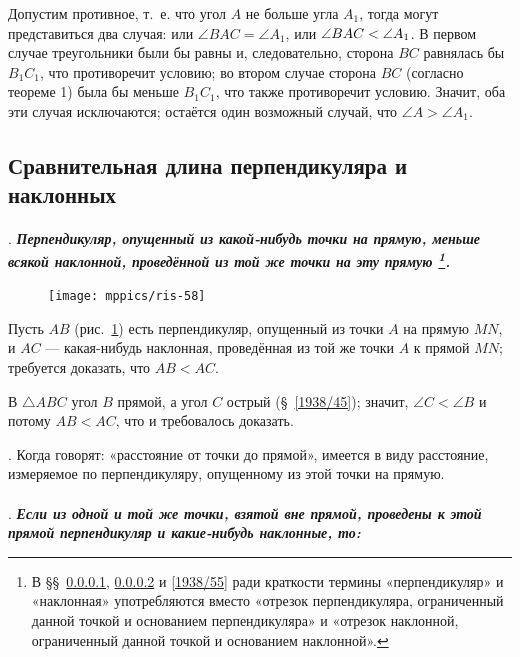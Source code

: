 \documentclass[oneside]{book}
\begin{document}
Допустим противное, т.~е. что угол $A$ не больше угла $A_1$, тогда могут представиться два случая:
или $\angle BAC = \angle A_1$, или $\angle BAC \z< \angle A_1$.
В первом случае треугольники были бы равны и, следовательно, сторона $BC$ равнялась бы $B_1C_1$, что противоречит условию;
во втором случае сторона $BC$ (согласно теореме 1) была бы меньше $B_1C_1$, что также противоречит условию.
Значит, оба эти случая исключаются;
остаётся один возможный случай, что $\angle A > \angle A_1$.


\subsection*{Сравнительная длина перпендикуляра и наклонных}


\paragraph{}\label{1938/53}
.
\textbf{\emph{Перпендикуляр, опущенный из какой-нибудь точки на прямую, меньше всякой наклонной, проведённой из той же точки на эту прямую%
\footnote{В §§~\ref{1938/53}, \ref{1938/54} и \ref{1938/55} ради краткости термины «перпендикуляр» и «наклонная» употребляются вместо «отрезок перпендикуляра, ограниченный данной точкой и основанием перпендикуляра» и «отрезок наклонной, ограниченный данной точкой и основанием наклонной».}.%
}}

\begin{figure}
\centering
\texttt{[image: mppics/ris-58]}
\caption{}\label{1938/ris-58}
\end{figure}

Пусть $AB$ (рис.~\ref{1938/ris-58}) есть перпендикуляр, опущенный из точки $A$ на прямую $MN$, и $AC$ — какая-нибудь наклонная, проведённая из той же точки $A$ к прямой $MN$;
требуется доказать, что $AB<AC$.

В $\triangle ABC$ угол $B$ прямой, а угол $C$ острый (§~\ref{1938/45});
значит, $\angle C<\angle B$ и потому $AB<AC$, что и требовалось доказать.

\mbox{.}
Когда говорят:
«расстояние от точки до прямой», имеется в виду  расстояние, измеряемое по перпендикуляру, опущенному из этой точки на прямую.

\paragraph{}\label{1938/54}
.
\textbf{\emph{Если из одной и той же точки, взятой вне прямой, проведены к этой прямой перпендикуляр и какие-нибудь наклонные, то:}}
\end{document}
